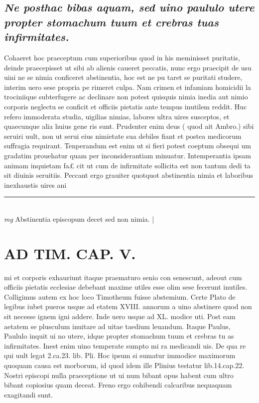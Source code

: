 \documentclass{article}
\begin{document}
\begin{pages}
\subsection*{\textit{Ne posthac bibas aquam, sed uino paululo utere propter stomachum tuum et crebras tuas infirmitates. }}\pstart Cohaeret hoc praeceptum cum superioribus quod in his meminisset puritatis, deinde praecepisset ut sibi ab alienis caueret peccatis, nunc ergo praecipit de usu uini ne se nimia conficeret abstinentia, hoc est ne pu taret se puritati studere, interim uero sese propria pe rimeret culpa. Nam crimen et infamiam homicidii la trociniique subterfugere ac declinare non potest quisquis nimia inedia aut nimio corporis neglectu se conficit et officiis pietatis ante tempus inutilem reddit. Huc refero immoderata studia, uigilias nimias, labores ultra uires susceptos, et quaecunque alia huius gene ris sunt. Prudenter enim deus ( quod ait Ambro.) sibi seruiri uult, non ut serui eius nimietate sua debiles fiant et postea medicorum suffragia requirant. Tenperandum est enim ut si fieri potest coeptum obsequi um gradatim prouehatur quam per inconsiderantiam minuatur. Intemperantia ipsam animam inquietam fa£ cit ut cum de infirmitate sollicita est non tantum dedi ta sit diuinis seruitiis. Peccant ergo grauiter quotquot abstinentia nimia et laboribus inexhaustis uires ani\pend
\vspace{0.5cm}\noindent
\vspace{0.2cm}\rule{1cm}{0.2pt}\\ 
\hspace{0.2cm}\textit{mg}
\footnotesize Abstinentia episcopum decet sed non nimia. 
\normalsize| 
\section*{AD TIM. CAP. V. }
\marginpar{[ p.161 ]}\pstart mi et corporis exhauriunt itaque praematuro senio con senescunt, adeout cum officiis pietatis ecclesiae debebant maxime utiles esse olim sese fecerunt inutiles. Colligimus autem ex hoc loco Timotheum fuisse abstemium. Certe Plato de legibus iubet pueros usque ad etatem XVIII. annorum a uino abstinere quod non sit necesse ignem igni addere. Inde uero usque ad XL. modice uti. Post eam aetatem se plusculum inuitare ad uitae taedium leuandum. Itaque Paulus, Paululo inquit ui no utere, idque propter stomachum tuum et crebras tu as infirmitates. Inest enim uino temperate sumpto mi ra medicandi uis. De qua re qui uult legat 2.ca.23. lib.  Pli. Hoc ipsum si sumatur immodice maximorum quoquam causa est morborum, id quod idem ille Plinius testatur lib.14.cap.22. Nostri episcopi nulla praeceptione ut ui num bibant opus habent cum ultro bibant copiosius quam deceat. Freno ergo cohibendi calcaribus nequaquam exagitandi sunt.  \pend
{}
{}

\end{pages}
\end{document}
